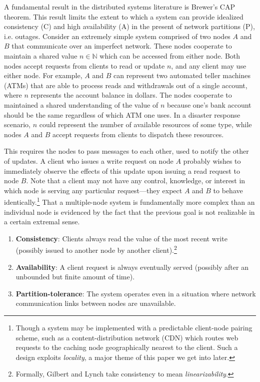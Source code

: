 A fundamental result in the distributed systems literature is Brewer's
CAP theorem. This result limits the extent to which a system can
provide idealized consistency (C) and high availability (A) in the
present of network partitions (P), i.e. outages. Consider an extremely
simple system comprised of two nodes $A$ and $B$ that communicate over
an imperfect network. These nodes cooperate to maintain a shared value
$n \in \mathbb{N}$ which can be accessed from either node. Both nodes
accept requests from clients to read or update $n$, and any client may
use either node. For example, $A$ and $B$ can represent two automated
teller machines (ATMs) that are able to process reads and withdrawals
out of a single account, where $n$ represents the account balance in
dollars. The nodes cooperate to maintained a shared understanding of
the value of $n$ because one's bank account should be the same
regardless of which ATM one uses. In a disaster response scenario, $n$
could represent the number of available resources of some type, while
nodes $A$ and $B$ accept requests from clients to dispatch these
resources.

This requires the nodes to pass messages to each other, used to notify
the other of updates. A client who issues a write request on node $A$
probably wishes to immediately observe the effects of this update upon
issuing a read request to node $B$. Note that a client may not have
any control, knowledge, or interest in which node is serving any
particular request---they expect $A$ and $B$ to behave
identically.\footnote{Though a system may be implemented with a
predictable client-node pairing scheme, such as a content-distribution
network (CDN) which routes web requests to the caching node
geographically nearest to the client.  Such a design exploits
\emph{locality}, a major theme of this paper we get into later.} That
a multiple-node system is fundamentally more complex than an
individual node is evidenced by the fact that the previous goal is not
realizable in a certain extremal sense.

\begin{enumerate}
\item \textbf{Consistency}: Clients always read the value of the most
  recent write (possibly issued to another node by another
  client).\footnote{Formally, Gilbert and Lynch
  \cite{2002gilbertlynchCAP} take consistency to mean
  \emph{linearizability}.}
\item \textbf{Availability}: A client request is always eventually
  served (possibly after an unbounded but finite amount of time).
\item \textbf{Partition-tolerance}: The system operates even in a
  situation where network communication links between nodes are
  unavailable.
\end{enumerate}

